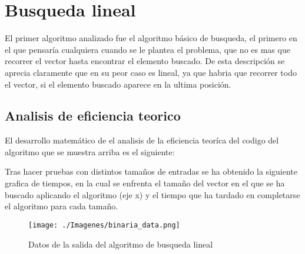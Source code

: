 \section{Busqueda lineal}

El primer algoritmo analizado fue el algoritmo b\'asico de busqueda, el primero en el que pensaría cualquiera cuando se le plantea el problema, que no es mas que recorrer el vector hasta encontrar el elemento buscado. De esta descripci\'on se aprecia claramente que en su peor caso es lineal, ya que habria que recorrer todo el vector, si el elemento buscado aparece en la ultima posición.

\subsection{Analisis de eficiencia teorico}


El desarrollo matemático de el analisis de la eficiencia teoríca del codigo del algoritmo que se muestra arriba es el siguiente:


Tras hacer pruebas con distintos tamaños de entradas se ha obtenido la siguiente grafica de tiempos, en la cual se enfrenta el tamaño del vector en el que se ha buscado aplicando el algoritmo (eje x) y el tiempo que ha tardado en completarse el algoritmo para cada tamaño.

\begin{figure}[h]
  \texttt{[image: ./Imagenes/binaria\_data.png]}
  \caption{Datos de la salida del algoritmo de busqueda lineal}
\end{figure}
